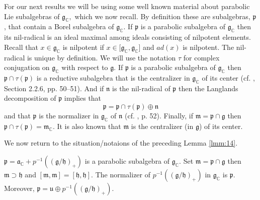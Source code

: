 \documentclass{amse-new}
\numberwithin{equation}{section} %
\begin{document}
For our next results we will be using some well known material about parabolic Lie subalgebras of
$\mathfrak{g}_{\mathbb{C}},$ which we now recall. By definition these are
subalgebras, $\mathfrak{p}$, that contain a Borel  subalgebra of $\mathfrak{g}_\mathbb{C}$. If $\mathfrak{p}$ is
a parabolic subalgebra of $\mathfrak{g}_{\mathbb{C}}$ then its nil-radical  is
an ideal maximal among ideals consisting of nilpotent elements.  Recall that
$x\in\mathfrak{g}_{\mathbb{C}}$ is nilpotent if $x\in\lbrack\mathfrak{g}%
_{\mathbb{C}},\mathfrak{g}_{\mathbb{C}}]$ and $ad(x)$ is nilpotent. The
nil-radical is unique by definition.  We will use the notation $\tau$ for complex conjugation
on $\mathfrak{g}_{\mathbb{C}}$ with respect to $\mathfrak{g}$. If
$\mathfrak{p}$ is a parabolic subalgebra of $\mathfrak{g}_{\mathbb{C}}$ then
$\mathfrak{p}\cap\tau\left(  \mathfrak{p}\right)$
is a reductive subalgebra that is the centralizer in $\mathfrak{g}_{\mathbb{C}%
}$ of its center (cf. \cite{Wallach2}, Section 2.2.6, pp. 50--51).
And if $\mathfrak{n}$ is the nil-radical of $\mathfrak{p}$ then the Langlands decomposition of $\mathfrak{p}$
implies that
\[
\mathfrak{p}=\mathfrak{p}\cap\tau\left(  \mathfrak{p}\right)  \oplus\mathfrak{n}
\]
and that $\mathfrak{p}$ is the normalizer in $\mathfrak{g}_{\mathbb{C}}$ of $\mathfrak{n}$ (cf. \cite{Wallach2}, p. 52). Finally, if $\mathfrak{m}=\mathfrak{p\cap\mathfrak{g}}$ then $\mathfrak{p}%
\cap\tau\left(  \mathfrak{p}\right)  =\mathfrak{m}_{\mathbb{C}}$. It is also known that $\mathfrak{m}$ is the centralizer (in $\mathfrak{g}$) of its center.

We now return to the situation/notaions of the preceding Lemma \ref{lmm:14}.

\begin{theorem}
\label{thm:The-parabolic}$\mathfrak{p}=\mathfrak{a}_{\mathbb{C}}%
+p^{-1}((\mathfrak{g}/\mathfrak{h})_{+})$ is a parabolic subalgebra of
$\mathfrak{g}_{\mathbb{C}}$. Set $\mathfrak{m}=\mathfrak{p}\cap\mathfrak{g}$
then $\mathfrak{m}\supset\mathfrak{h}$ and $[\mathfrak{m},\mathfrak{m}%
]=[\mathfrak{h},\mathfrak{h}]$. The normalizer of $p^{-1} ((\mathfrak{g}/\mathfrak{h})_+)$ in $\mathfrak{g}_{\mathbb{C}}$ is $\mathfrak{p}$. Moreover, $\mathfrak{p}=\mathfrak{u}\oplus p^{-1} ((\mathfrak{g}/\mathfrak{h})_+)$.
\end{theorem}
\end{document}
